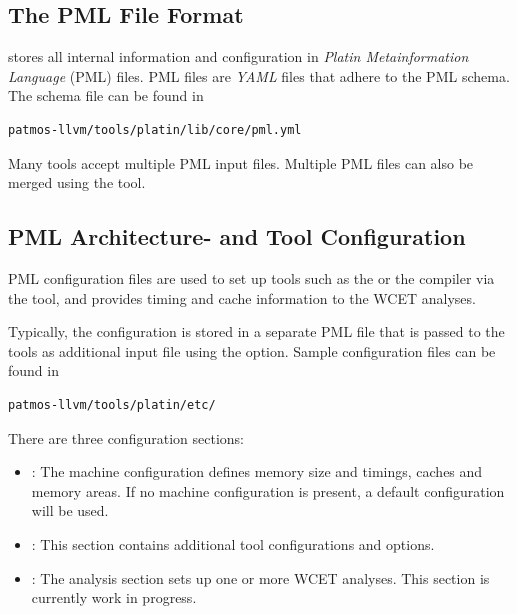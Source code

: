 \subsection{The PML File Format}

 stores all internal information and configuration in \emph{Platin Metainformation Language} (PML) files.
PML files are \emph{YAML} files that adhere to the PML schema. The schema file can be found in

\begin{verbatim}
patmos-llvm/tools/platin/lib/core/pml.yml
\end{verbatim}


Many  tools accept multiple PML input files. Multiple PML files can also be merged using
the  tool.

\subsection{PML Architecture- and Tool Configuration}

PML configuration files are used to set up tools such as the  or the
 compiler via the  tool, and provides timing and cache information to the WCET analyses.

Typically, the configuration is stored in a separate PML file that is passed to the  tools as
additional input file using the  option. Sample configuration files can be found in

\begin{verbatim}
patmos-llvm/tools/platin/etc/
\end{verbatim}




There are three configuration sections: 
\begin{itemize}
\item {}: The machine configuration defines memory size and timings, caches and memory areas.
  If no machine configuration is present, a default configuration will be used.
\item {}: This section contains additional tool configurations and options.
\item {}: The analysis section sets up one or more WCET analyses. This section is currently work in progress.
\end{itemize}

